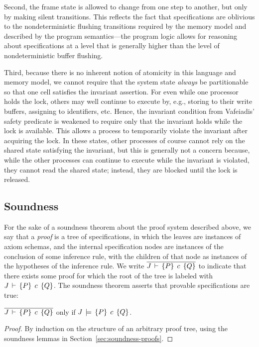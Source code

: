 \documentclass[11pt]{report}         %
\begin{document}
Second, the frame state is allowed to change from one step to another, but only by making silent transitions. This reflects the fact that specifications are oblivious to the nondeterministic flushing transitions required by the memory model and described by the program semantics---the program logic allows for reasoning about specifications at a level that is generally higher than the level of nondeterministic buffer flushing. 

Third, because there is no inherent notion of atomicity in this language and memory model, we cannot require that the system state \emph{always} be partitionable so that one cell satisfies the invariant assertion. For even while one processor holds the lock, others may well continue to execute by, e.g., storing to their write buffers, assigning to identifiers, etc. Hence, the invariant condition from Vafeiadis' safety predicate is weakened to require only that the invariant holds while the lock is available. This allows a process to  temporarily violate the invariant after acquiring the lock. In these states, other processes of course cannot rely on the shared state satisfying the invariant, but this is generally not a concern because, while the other processes can continue to execute while the invariant is violated, they cannot read the shared state; instead, they are blocked until the lock is released. 


\subsection{Soundness}
\label{sec:soundness}


For the sake of a soundness theorem about the proof system described above, we say that a \emph{proof} is a tree of specifications, in which the leaves are instances of axiom schemas, and the internal specification nodes are instances of the conclusion of some inference rule, with the children of that node as instances of the hypotheses of the inference rule. We write $\overline{J\,\vdash\,\left\lbrace P \right\rbrace\;c\;\left\lbrace Q \right\rbrace}$ to indicate that there exists some proof for which the root of the tree is labeled with $J\,\vdash\,\left\lbrace P \right\rbrace\;c\;\left\lbrace Q \right\rbrace$. The soundness theorem asserts that provable specifications are true: 

\begin{theorem}[Soundness]
  \label{thm:soundness}
      $\overline{J\,\vdash\,\left\lbrace P \right\rbrace\;c\;\left\lbrace Q \right\rbrace}$ only if $J\,\models\,\left\lbrace P \right\rbrace\;c\;\left\lbrace Q \right\rbrace$. 
\end{theorem}

\begin{proof}
      By induction on the structure of an arbitrary proof tree, using the soundness lemmas in Section~\ref{sec:soundness-proofs}. 
\end{proof}
\end{document}
